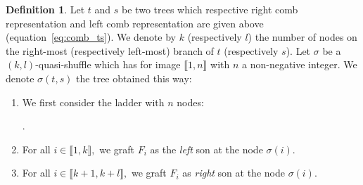 \documentclass[a4paper,10pt]{amsart}
\newcommand{\IEM}[2]{\llbracket #1,#2 \rrbracket}
\theoremstyle{definition}
\newtheorem{defi}{Definition}
\begin{document}
\begin{defi}\label{def:quasiaction}
	Let $t$ and $s$ be two trees which respective right comb representation and left comb representation are given above (equation~\eqref{eq:comb_ts}).
	We denote by $k$ (respectively $l$) the number of nodes on the right-most (respectively left-most) branch of $t$ (respectively $s$). Let $\sigma$ be a $(k,l)$-quasi-shuffle which has for image $\IEM{1}{n}$ with $n$ a non-negative integer. We denote $\sigma(t,s)$ the tree obtained this way:
	\begin{enumerate}
		\item  We first consider the ladder with $n$ nodes:
		\begin{center}
			.
		\end{center}
		\item For all $i\in\IEM{1}{k},$ we graft $F_i$ as the \emph{left} son at the node $\sigma(i)$.
		\item For all $i\in\IEM{k+1}{k+l},$ we graft $F_i$ as \emph{right} son at the node $\sigma(i)$.
	\end{enumerate}
\end{defi}
\end{document}
